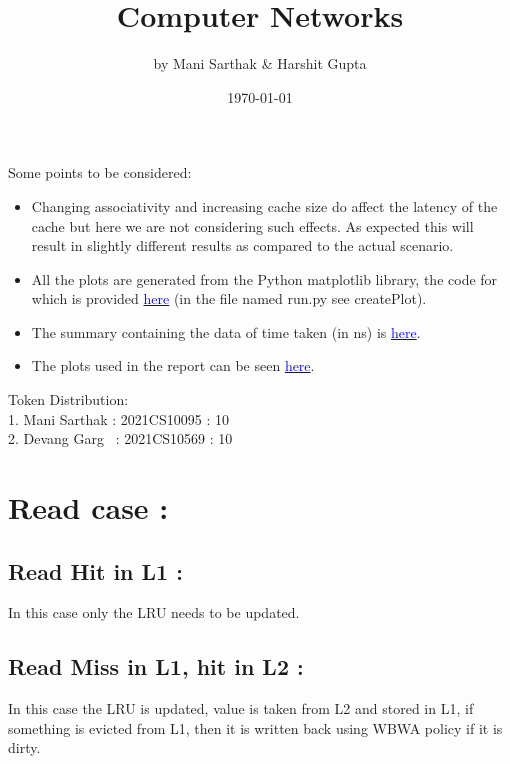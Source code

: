 \documentclass[11pt]{scrartcl}
\author{ by Mani Sarthak \& Harshit Gupta}
\date{\today}
\title{Computer Networks}
\begin{document}
\maketitle

Some points to be considered:
\begin{itemize}
    \item Changing associativity and increasing cache size do affect the latency of the cache but here we are not considering such effects. As expected this will result in slightly different results as compared to the actual scenario.
    \item All the plots are generated from the Python matplotlib library, the code for which is provided \href{https://drive.google.com/drive/folders/1ggkQp2t3NUP2j-lU_Dst7DpPSrZ3AbAS?usp=sharing}{\textcolor{blue}{here}} (in the file named run.py see createPlot).
    \item The summary containing the data of time taken (in ns) is \href{https://drive.google.com/file/d/1tbcX3iz1-sOLc5bymLP_e-yGbUJjtBvu/view?usp=sharing}{\textcolor{blue}{here}}.
    \item The plots used in the report can be seen \href{https://drive.google.com/drive/folders/170nIbyIFCMwzpfevd__3WixwtmWZnnlW?usp=share_link}{\textcolor{blue}{here}}.

    
    
\end{itemize}

\vfill
\begin{center}
   Token Distribution:
\\
1. Mani Sarthak : 2021CS10095 : 10
\\
2. Devang Garg \ : 2021CS10569 : 10 
\end{center}




\newpage
\section{ Read case :}
\subsection{ Read Hit in L1 :} 
In this case only the LRU needs to be updated.
\subsection{ Read Miss in L1, hit in L2 :}
In this case the LRU is updated, value is taken from L2 and stored in L1, if something is evicted from L1, then it is written back using WBWA policy if it is dirty.
\end{document}
